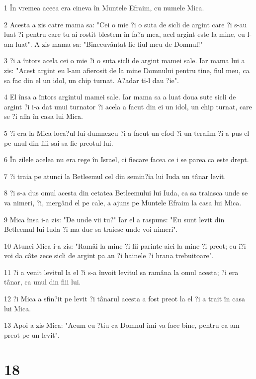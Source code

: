 \par 1 În vremea aceea era cineva în Muntele Efraim, cu numele Mica.
\par 2 Acesta a zis catre mama sa: "Cei o mie ?i o suta de sicli de argint care ?i s-au luat ?i pentru care tu ai rostit blestem în fa?a mea, acel argint este la mine, eu l-am luat". A zis mama sa: "Binecuvântat fie fiul meu de Domnul!"
\par 3 ?i a întors acela cei o mie ?i o suta sicli de argint mamei sale. Iar mama lui a zis: "Acest argint eu l-am afierosit de la mine Domnului pentru tine, fiul meu, ca sa fac din el un idol, un chip turnat. A?adar ti-l dau ?ie".
\par 4 El însa a întors argintul mamei sale. Iar mama sa a luat doua sute sicli de argint ?i i-a dat unui turnator ?i acela a facut din ei un idol, un chip turnat, care se ?i afla în casa lui Mica.
\par 5 ?i era la Mica loca?ul lui dumnezeu ?i a facut un efod ?i un terafim ?i a pus el pe unul din fiii sai sa fie preotul lui.
\par 6 În zilele acelea nu era rege în Israel, ci fiecare facea ce i se parea ca este drept.
\par 7 ?i traia pe atunci la Betleemul cel din semin?ia lui Iuda un tânar levit.
\par 8 ?i s-a dus omul acesta din cetatea Betleemului lui Iuda, ca sa traiasca unde se va nimeri, ?i, mergând el pe cale, a ajuns pe Muntele Efraim la casa lui Mica.
\par 9 Mica însa i-a zis: "De unde vii tu?" Iar el a raspuns: "Eu sunt levit din Betleemul lui Iuda ?i ma duc sa traiesc unde voi nimeri".
\par 10 Atunci Mica i-a zis: "Ramâi la mine ?i fii parinte aici la mine ?i preot; eu î?i voi da câte zece sicli de argint pa an ?i hainele ?i hrana trebuitoare".
\par 11 ?i a venit levitul la el ?i s-a învoit levitul sa ramâna la omul acesta; ?i era tânar, ca unul din fiii lui.
\par 12 ?i Mica a sfin?it pe levit ?i tânarul acesta a fost preot la el ?i a trait în casa lui Mica.
\par 13 Apoi a zis Mica: "Acum eu ?tiu ca Domnul îmi va face bine, pentru ca am preot pe un levit".

\chapter{18}

